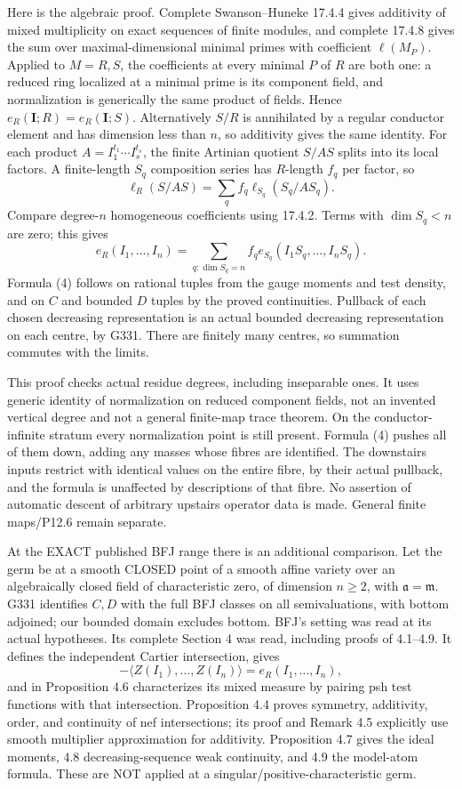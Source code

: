 \documentclass[
  11pt,
]{article}
\begin{document}
Here is the algebraic proof. Complete Swanson--Huneke 17.4.4 gives
additivity of mixed multiplicity on exact sequences of finite modules,
and complete 17.4.8 gives the sum over maximal-dimensional minimal
primes with coefficient \(\ell(M_P)\). Applied to \(M=R,S\), the
coefficients at every minimal \(P\) of \(R\) are both one: a reduced
ring localized at a minimal prime is its component field, and
normalization is generically the same product of fields. Hence
\(e_R(\boldsymbol I;R)=e_R(\boldsymbol I;S)\). Alternatively \(S/R\) is
annihilated by a regular conductor element and has dimension less than
\(n\), so additivity gives the same identity. For each product
\(A=I_1^{t_1}\cdots I_s^{t_s}\), the finite Artinian quotient \(S/AS\)
splits into its local factors. A finite-length \(S_q\) composition
series has \(R\)-length \(f_q\) per factor, so
\[\ell_R(S/AS)=\sum_q f_q\ell_{S_q}(S_q/AS_q).\] Compare degree-\(n\)
homogeneous coefficients using 17.4.2. Terms with \(\dim S_q<n\) are
zero; this gives
\[e_R(I_1,\ldots,I_n)=\sum_{q:\dim S_q=n} f_q e_{S_q}(I_1S_q,\ldots,I_nS_q).\]
Formula (4) follows on rational tuples from the gauge moments and test
density, and on \(C\) and bounded \(D\) tuples by the proved
continuities. Pullback of each chosen decreasing representation is an
actual bounded decreasing representation on each centre, by G331. There
are finitely many centres, so summation commutes with the limits.

This proof checks actual residue degrees, including inseparable ones. It
uses generic identity of normalization on reduced component fields, not
an invented vertical degree and not a general finite-map trace theorem.
On the conductor-infinite stratum every normalization point is still
present. Formula (4) pushes all of them down, adding any masses whose
fibres are identified. The downstairs inputs restrict with identical
values on the entire fibre, by their actual pullback, and the formula is
unaffected by descriptions of that fibre. No assertion of automatic
descent of arbitrary upstairs operator data is made. General finite
maps/P12.6 remain separate.

At the EXACT published BFJ range there is an additional comparison. Let
the germ be at a smooth CLOSED point of a smooth affine variety over an
algebraically closed field of characteristic zero, of dimension
\(n\ge2\), with \(\mathfrak a=\mathfrak m\). G331 identifies \(C,D\)
with the full BFJ classes on all semivaluations, with bottom adjoined;
our bounded domain excludes bottom. BFJ's setting was read at its actual
hypotheses. Its complete Section 4 was read, including proofs of
4.1--4.9. It defines the independent Cartier intersection, gives
\[-\langle Z(I_1),\ldots,Z(I_n)\rangle=e_R(I_1,\ldots,I_n),\] and in
Proposition 4.6 characterizes its mixed measure by pairing psh test
functions with that intersection. Proposition 4.4 proves symmetry,
additivity, order, and continuity of nef intersections; its proof and
Remark 4.5 explicitly use smooth multiplier approximation for
additivity. Proposition 4.7 gives the ideal moments, 4.8
decreasing-sequence weak continuity, and 4.9 the model-atom formula.
These are NOT applied at a singular/positive-characteristic germ.
\end{document}
